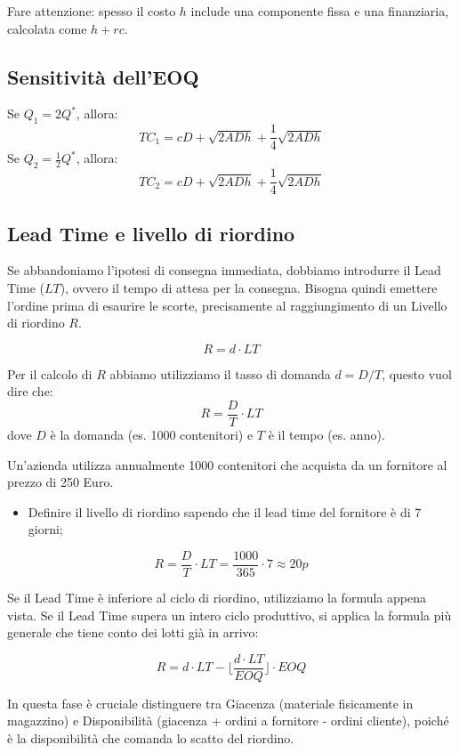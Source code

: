 \begin{note}
    Fare attenzione: spesso il costo $h$ include una componente fissa e una finanziaria, calcolata come $h + rc$.
\end{note}

%
\subsection{Sensitività dell'EOQ}
Se $ Q_{1} = 2Q^{*} $, allora:
\[
    TC_{1} = cD + \sqrt{2ADh} + \frac{1}{4} \sqrt{2ADh}
\]
Se $ Q_{2} = \frac{1}{2}Q^{*} $, allora:
\[
    TC_{2} = cD + \sqrt{2ADh} + \frac{1}{4}\sqrt{2ADh}
\]

%
\subsection{Lead Time e livello di riordino}
Se abbandoniamo l'ipotesi di consegna immediata, dobbiamo introdurre il Lead Time ($LT$), ovvero il tempo di attesa per la consegna. Bisogna quindi emettere l'ordine prima di esaurire le scorte, precisamente al raggiungimento di un Livello di riordino $R$.

\[
    R = d \cdot LT
\]

Per il calcolo di $R$ abbiamo utilizziamo il tasso di domanda $d = D/T$, questo vuol dire che:
\[
    R = \frac{D}{T} \cdot LT
\]
dove $ D $ è la domanda (es. 1000 contenitori) e $ T $ è il tempo (es. anno).
\begin{example}
    Un'azienda utilizza annualmente 1000 contenitori che acquista da un
    fornitore al prezzo di 250 Euro.
    \begin{itemize}
        \item Definire il livello di riordino sapendo che il lead time del fornitore è di 7 giorni;
    \end{itemize}
    \[
        R = \frac{D}{T} \cdot LT = \frac{1000}{365} \cdot 7 \approx 20 \si{p}
    \]
\end{example}


Se il Lead Time è inferiore al ciclo di riordino, utilizziamo la formula appena vista. Se il Lead Time supera un intero ciclo produttivo, si applica la formula più generale che tiene conto dei lotti già in arrivo:

\[
    R = d \cdot LT - \lfloor \frac{d \cdot LT}{EOQ} \rfloor \cdot EOQ
\]

In questa fase è cruciale distinguere tra Giacenza (materiale fisicamente in magazzino) e Disponibilità (giacenza + ordini a fornitore - ordini cliente), poiché è la disponibilità che comanda lo scatto del riordino.

